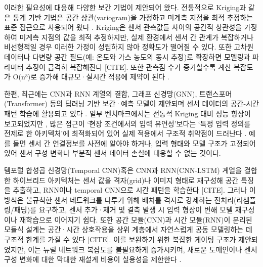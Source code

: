 \documentclass[final,5p,times,twocolumn,authoryear]{elsarticle}
\begin{document}


이러한 필요성에 대응해 다양한 보간 기법이 제안되어 왔다. 전통적으로 Kriging과 같은 통계 기반 기법은 공간 상관(variogram)을 가정하고 미계측 지점을 최적 추정하는 표준 접근으로 사용되어 왔다 \cite{oliver_tutorial_2014}. Kriging은 센서 관측값들 사이의 공간적 상관성을 가정하여 미계측 지점의 값을 최적 추정하지만, 실제 환경에서 센서 간 관계가 복잡하거나 비선형적일 경우 이러한 가정이 성립하지 않아 정확도가 떨어질 수 있다. 또한 고차원 데이터나 다변량 공간 필드(예: 온도와 가스 농도의 동시 추정)로 확장하면 모델링과 파라미터 추정이 급격히 복잡해진다 [CITE]. 또한 관측점 수가 증가할수록 계산 복잡도가 O(n³)로 증가해 대규모·실시간 적용에 제약이 된다 \cite{van_stein_cluster-based_2020}.


한편, 최근에는 CNN과 RNN 계열의 결합, 그래프 신경망(GNN), 트랜스포머(Transformer) 등의 딥러닝 기반 보간·예측 모델이 제안되며 센서 데이터의 공간-시간 패턴 학습에 활용되고 있다 \cite{shi2015convlstm,yu2017stgcn,vaswani2017transformer,zhou2020informer}. 일부 벤치마크에서는 전통적 Kriging 대비 성능 향상이 보고되었지만 \cite{yu2017stgcn,zhou2020informer}, 많은 접근이 ‘현장 조건에서의 입력 유연성’보다는 ‘특정 입력 정의를 전제로 한 아키텍처’에 최적화되어 있어 실제 적용에서 구조적 취약점이 드러난다 \cite{yu2017stgcn,kipf2016gcn}. 예를 들면 센서 간 연결정보를 사전에 알아야 하거나, 입력 형태와 모델 구조가 고정되어 있어 센서 구성 변화나 부분적 센서 데이터 손실에 대응할 수 없는 것이다. 

템포럴 합성곱 신경망(Temporal CNN)혹은 CNN과 RNN(CNN-LSTM) 계열을 결합한 하이브리드 아키텍처는 센서 값을 격자(grid)나 이미지 형태로 재구성해 공간 특징을 추출하고, RNN이나 temporal CNN으로 시간 패턴을 학습한다 \cite{shi2015convlstm}[CITE]. 그러나 이 방식은 불규칙한 센서 네트워크를 다루기 위해 배치를 격자로 강제하는 전처리(리샘플링/패딩)를 요구하고, 센서 추가·제거 및 결측 발생 시 입력 형상이 변해 모델 재구성이나 재학습으로 이어지기 쉽다. 또한 공간 모듈(CNN)과 시간 모듈(RNN)이 분리된 모듈식 설계는 공간·시간 상호작용을 상위 계층에서 자연스럽게 공동 모델링하는 데 구조적 한계를 가질 수 있다 [CITE]. 이를 보완하기 위한 복잡한 게이팅 구조가 제안되었지만, 이는 뉴럴 네트워크 복잡도를 불필요하게 증가시키며, 새로운 도메인이나 센서 구성 변화에 대한 막대한 재설계 비용이 실용성을 제한한다 \cite{jing2019mlclstm}.
\end{document}

